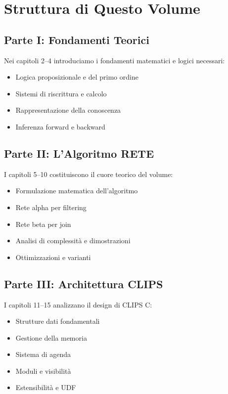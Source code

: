 \section{Struttura di Questo Volume}

\subsection{Parte I: Fondamenti Teorici}

Nei capitoli 2--4 introduciamo i fondamenti matematici e logici necessari:

\begin{itemize}
\item Logica proposizionale e del primo ordine
\item Sistemi di riscrittura e calcolo
\item Rappresentazione della conoscenza
\item Inferenza forward e backward
\end{itemize}

\subsection{Parte II: L'Algoritmo RETE}

I capitoli 5--10 costituiscono il cuore teorico del volume:

\begin{itemize}
\item Formulazione matematica dell'algoritmo
\item Rete alpha per filtering
\item Rete beta per join
\item Analisi di complessità e dimostrazioni
\item Ottimizzazioni e varianti
\end{itemize}

\subsection{Parte III: Architettura CLIPS}

I capitoli 11--15 analizzano il design di CLIPS C:

\begin{itemize}
\item Strutture dati fondamentali
\item Gestione della memoria
\item Sistema di agenda
\item Moduli e visibilità
\item Estensibilità e UDF
\end{itemize}

